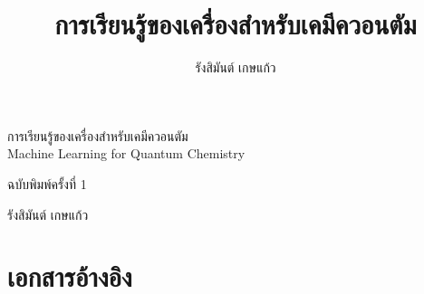 



\let\cleardoublepage\clearpage

\title{การเรียนรู้ของเครื่องสำหรับเคมีควอนตัม}
\author{รังสิมันต์ เกษแก้ว}



\frontmatter

\thispagestyle{empty}

\begin{flushright}
\vspace*{2.0in}

\begin{spacing}{3}
{\huge การเรียนรู้ของเครื่องสำหรับเคมีควอนตัม}\\
{\LARGE Machine Learning for Quantum Chemistry}
\end{spacing}

\vspace{0.25in}

{ฉบับพิมพ์ครั้งที่ 1}

\vspace{1in}

{\Large รังสิมันต์ เกษแก้ว}\\
\vspace{0.5in}

\vfill

\end{flushright}



 

\tableofcontents\label{cha:toc}


\mainmatter



 
 
 
 
 
 
 
 
 
 
 
 
\appendix
 
 

\backmatter

\chapter*{เอกสารอ้างอิง}

\printbibliography[heading=none]

\printindex


